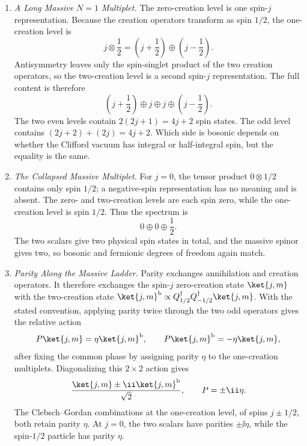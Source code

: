 \begin{enumerate}
  \begin{enumerate}
    \item \emph{A Long Massive \(N=1\) Multiplet.}
    The zero-creation level is one spin-\(j\) representation.  Because the
      creation operators transform as spin \(1/2\), the one-creation level is
      \[
        j\otimes\frac12
          =\left(j+\frac12\right)\oplus
           \left(j-\frac12\right).
      \]
      Antisymmetry leaves only the spin-singlet product of the two creation
      operators, so the two-creation level is a second spin-\(j\)
      representation.  The full content is therefore
      \[
        \left(j+\frac12\right)\oplus j\oplus j
          \oplus\left(j-\frac12\right).
      \]
      The two even levels contain \(2(2j+1)=4j+2\) spin states.  The odd level
      contains \((2j+2)+(2j)=4j+2\).  Which side is bosonic depends on whether
      the Clifford vacuum has integral or half-integral spin, but the equality
      is the same.
    \item \emph{The Collapsed Massive Multiplet.}
    For \(j=0\), the tensor product
      \(0\otimes1/2\) contains only spin \(1/2\); a negative-spin
      representation has no meaning and is absent.  The zero- and two-creation
      levels are each spin zero, while the one-creation level is spin \(1/2\).
      Thus the spectrum is
      \[
        0\oplus0\oplus\frac12.
      \]
      The two scalars give two physical spin states in total, and the massive
      spinor gives two, so bosonic and fermionic degrees of freedom again
      match.
    \item \emph{Parity Along the Massive Ladder.}
    Parity exchanges annihilation and creation operators.  It therefore
      exchanges the spin-\(j\) zero-creation state \(\ket{j,m}\) with the
      two-creation state
      \(\ket{j,m}^{\mathrm b}\propto
        Q^\dagger_{1/2}Q^\dagger_{-1/2}\ket{j,m}\).
      With the stated convention, applying parity twice through the two odd
      operators gives the relative action
      \[
        P\ket{j,m}=\eta\ket{j,m}^{\mathrm b},\qquad
        P\ket{j,m}^{\mathrm b}=-\eta\ket{j,m},
      \]
      after fixing the common phase by assigning parity \(\eta\) to the
      one-creation multiplets.  Diagonalizing this \(2\times2\) action gives
      \[
        \frac{\ket{j,m}\pm \ii\ket{j,m}^{\mathrm b}}{\sqrt2},
        \qquad P=\pm \ii\eta .
      \]
      The Clebsch--Gordan combinations at the one-creation level, of spins
      \(j\pm1/2\), both retain parity \(\eta\).  At \(j=0\), the two scalars
      have parities \(\pm \ii\eta\), while the spin-\(1/2\) particle has parity
      \(\eta\).
  \end{enumerate}


\end{enumerate}
